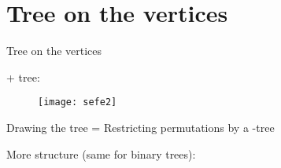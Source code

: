 \section{Tree on the vertices}

\begin{frame}{Tree on the vertices}

\probBook + tree:

\begin{overprint}
\begin{figure}\centering
\texttt{[image: sefe2]}
\end{figure}

Drawing the tree = Restricting permutations by a \PT-tree

\vspace{-1em}

More structure (same for binary trees):
\end{overprint}
\end{frame}

